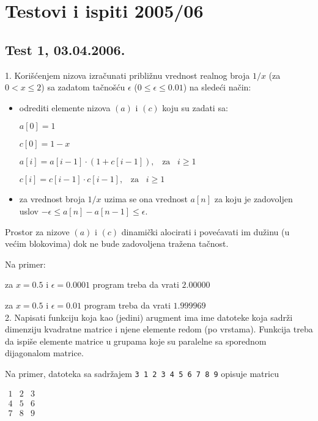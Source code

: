 \chapter{Testovi i ispiti 2005/06}

\section{Test 1, 03.04.2006.}


1. Kori\v s\' cenjem nizova izra\v cunati pribli\v znu vrednost
realnog broja $1/x$ (za $0 < x \le 2$) sa zadatom ta\v cno\v s\' cu
$\epsilon$ ($0 \le \epsilon \leq 0.01$) na slede\' ci na\v cin:
\begin{itemize}
\item odrediti elemente nizova $(a)$ i $(c)$ koju su zadati sa:

$a[0] = 1$

$c[0] = 1-x$

$a[i] = a[i-1] \cdot (1+c[i-1]), \;\;\; \textrm{za} \;\;\; i \ge 1$

$c[i] = c[i-1] \cdot c[i-1], \;\;\; \textrm{za} \;\;\; i \ge 1$

\item za vrednost broja $1/x$ uzima se ona vrednost $a[n]$ za koju
je zadovoljen uslov $-\epsilon \le a[n]-a[n-1] \le \epsilon$.
\end{itemize}

Prostor za nizove $(a)$ i $(c)$ dinami\v cki alocirati i pove\' cavati
im du\v zinu (u ve\'cim blokovima) dok ne bude zadovoljena tra\v zena
ta\v cnost.

Na primer:

za $x = 0.5$ i $\epsilon = 0.0001$ program treba da vrati $2.00000$

za $x = 0.5$ i $\epsilon = 0.01$ program treba da vrati $1.999969$ \\


2. Napisati funkciju koja kao (jedini) arugment ima ime datoteke
koja sadr\v{z}i dimenziju kvadratne matrice i njene elemente redom
(po vrstama). Funkcija treba da ispi\v{s}e elemente matrice u grupama
koje su paralelne sa sporednom dijagonalom matrice.

Na primer, datoteka sa sadr\v{z}ajem \verb|3 1 2 3 4 5 6 7 8 9|
opisuje matricu

$\begin{array}{ccc}
1 & 2 & 3 \\
4 & 5 & 6 \\
7 & 8 & 9
\end{array}$

